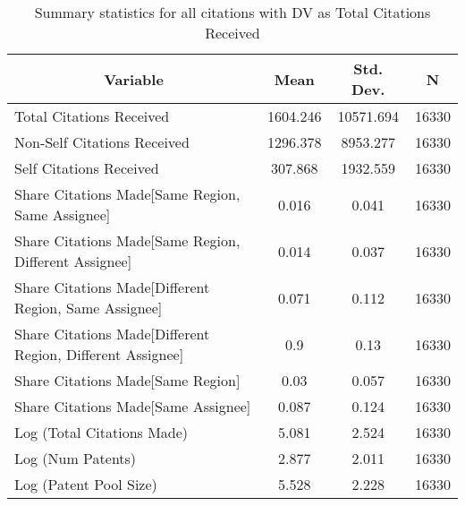
\begin{table}[htbp]\centering \caption{Summary statistics for all citations with DV as Total Citations Received \label{a.e.o.t.n.tsummary}}
\begin{tabular}{l c c  c}\hline\hline
\multicolumn{1}{c}{\textbf{Variable}} & \textbf{Mean}
 & \textbf{Std. Dev.} & \textbf{N}\\ \hline
Total Citations Received & 1604.246 & 10571.694  & 16330\\
Non-Self Citations Received & 1296.378 & 8953.277  & 16330\\
Self Citations Received & 307.868 & 1932.559  & 16330\\
Share Citations Made[Same Region, Same Assignee] & 0.016 & 0.041  & 16330\\
Share Citations Made[Same Region, Different Assignee] & 0.014 & 0.037  & 16330\\
Share Citations Made[Different Region, Same Assignee] & 0.071 & 0.112  & 16330\\
Share Citations Made[Different Region, Different Assignee] & 0.9 & 0.13  & 16330\\
Share Citations Made[Same Region] & 0.03 & 0.057  & 16330\\
Share Citations Made[Same Assignee] & 0.087 & 0.124  & 16330\\
Log (Total Citations Made) & 5.081 & 2.524  & 16330\\
Log (Num Patents) & 2.877 & 2.011  & 16330\\
Log (Patent Pool Size) & 5.528 & 2.228  & 16330\\
\hline\end{tabular}
\end{table}
